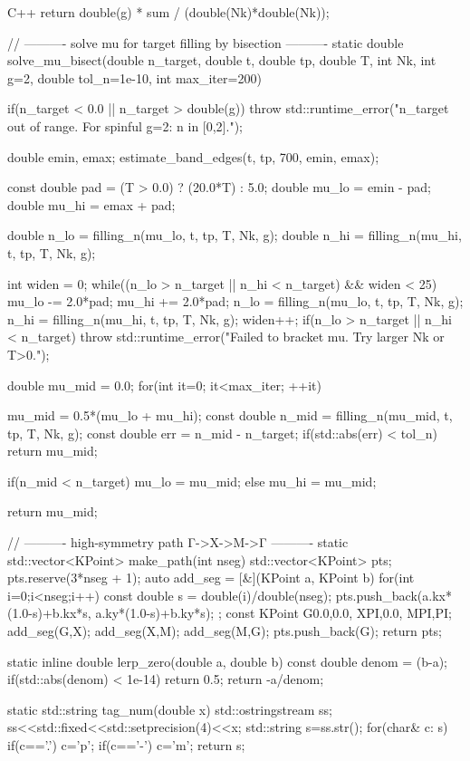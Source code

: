 \documentclass[12pt]{jreport}
\begin{document}
\begin{codebox}{C++}
{    return double(g) * sum / (double(Nk)*double(Nk));
}

// ---------- solve mu for target filling by bisection ----------
static double solve_mu_bisect(double n_target, double t, double tp, double T, int Nk,
                              int g=2, double tol_n=1e-10, int max_iter=200){
    if(n_target < 0.0 || n_target > double(g)){
        throw std::runtime_error("n_target out of range. For spinful g=2: n in [0,2].");
    }

    double emin, emax;
    estimate_band_edges(t, tp, 700, emin, emax);

    const double pad = (T > 0.0) ? (20.0*T) : 5.0;
    double mu_lo = emin - pad;
    double mu_hi = emax + pad;

    double n_lo = filling_n(mu_lo, t, tp, T, Nk, g);
    double n_hi = filling_n(mu_hi, t, tp, T, Nk, g);

    int widen = 0;
    while((n_lo > n_target || n_hi < n_target) && widen < 25){
        mu_lo -= 2.0*pad;
        mu_hi += 2.0*pad;
        n_lo = filling_n(mu_lo, t, tp, T, Nk, g);
        n_hi = filling_n(mu_hi, t, tp, T, Nk, g);
        widen++;
    }
    if(n_lo > n_target || n_hi < n_target){
        throw std::runtime_error("Failed to bracket mu. Try larger Nk or T>0.");
    }

    double mu_mid = 0.0;
    for(int it=0; it<max_iter; ++it){
        mu_mid = 0.5*(mu_lo + mu_hi);
        const double n_mid = filling_n(mu_mid, t, tp, T, Nk, g);
        const double err = n_mid - n_target;
        if(std::abs(err) < tol_n) return mu_mid;

        if(n_mid < n_target) mu_lo = mu_mid;
        else                 mu_hi = mu_mid;
    }
    return mu_mid;
}

// ---------- high-symmetry path Γ->X->M->Γ ----------
static std::vector<KPoint> make_path(int nseg){
    std::vector<KPoint> pts;
    pts.reserve(3*nseg + 1);
    auto add_seg = [&](KPoint a, KPoint b){
        for(int i=0;i<nseg;i++){
            const double s = double(i)/double(nseg);
            pts.push_back({a.kx*(1.0-s)+b.kx*s, a.ky*(1.0-s)+b.ky*s});
        }
    };
    const KPoint G{0.0,0.0}, X{PI,0.0}, M{PI,PI};
    add_seg(G,X);
    add_seg(X,M);
    add_seg(M,G);
    pts.push_back(G);
    return pts;
}

static inline double lerp_zero(double a, double b){
    const double denom = (b-a);
    if(std::abs(denom) < 1e-14) return 0.5;
    return -a/denom;
}

static std::string tag_num(double x){
    std::ostringstream ss;
    ss<<std::fixed<<std::setprecision(4)<<x;
    std::string s=ss.str();
    for(char& c: s){
        if(c=='.') c='p';
        if(c=='-') c='m';
    }
    return s;
}


\end{codebox}
\end{document}
